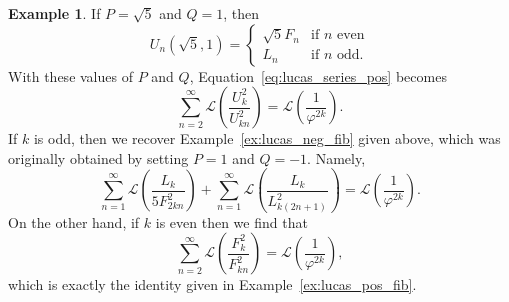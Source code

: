 \documentclass[10pt]{article}
\theoremstyle{definition}
\newtheorem{example}{Example}
\begin{document}
    \begin{example}
If $P=\sqrt{5}$ and $Q=1$, then
\begin{equation*}
    U_n(\sqrt{5},1) = \begin{cases}
    \sqrt{5}F_{n} &\text{if } n \text{ even} \\
    L_{n} &\text{if } n \text{ odd}.
\end{cases}
\end{equation*}
With these values of $P$ and $Q$, Equation~\eqref{eq:lucas_series_pos} becomes
\begin{equation*}
    \sum_{n=2}^{\infty}\mathcal{L}\left(\frac{U^2_{k}}{U^2_{kn}}\right)  = \mathcal{L}\left(\frac{1}{\varphi^{2k}}\right).
\end{equation*}
If $k$ is odd, then we recover Example~\ref{ex:lucas_neg_fib} given above, which was originally obtained by setting $P=1$ and $Q = -1$.  Namely,
\begin{equation*}
    \sum_{n=1}^{\infty}\mathcal{L}\left(\frac{L_k}{5F^2_{2kn}}\right) + \sum_{n=1}^{\infty}\mathcal{L}\left(\frac{L_k}{L^2_{k(2n+1)}}\right)  = \mathcal{L}\left(\frac{1}{\varphi^{2k}}\right).
\end{equation*}
On the other hand, if $k$ is even then we find that
\begin{equation*}
    \sum_{n=2}^{\infty}\mathcal{L}\left(\frac{F^2_k}{F^2_{kn}}\right) = \mathcal{L}\left(\frac{1}{\varphi^{2k}}\right),
\end{equation*}
which is exactly the identity given in Example~\ref{ex:lucas_pos_fib}.
\end{example}
\end{document}
